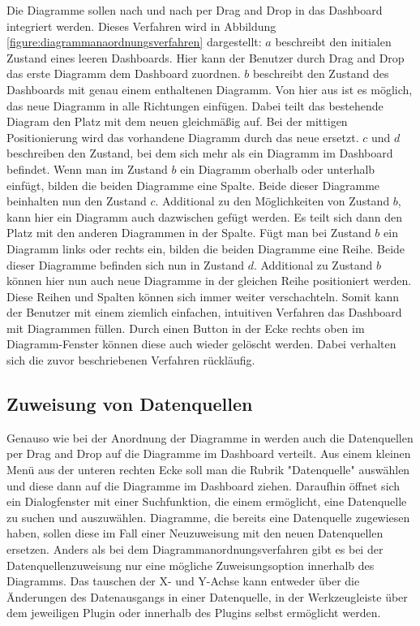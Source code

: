 Die Diagramme sollen nach und nach per Drag and Drop in das Dashboard integriert werden. Dieses Verfahren
wird in Abbildung \ref{figure:diagrammanaordnungsverfahren} dargestellt: \(a\) beschreibt den
initialen Zustand eines leeren Dashboards. Hier kann der Benutzer durch Drag and Drop das erste Diagramm dem Dashboard
zuordnen. \(b\) beschreibt den Zustand des Dashboards mit genau einem enthaltenen Diagramm. Von hier aus ist es möglich, das
neue Diagramm in alle Richtungen einfügen. Dabei teilt das bestehende Diagram den Platz mit dem neuen gleichmäßig
auf. Bei der mittigen Positionierung wird das vorhandene Diagramm durch das neue ersetzt. \(c\) und \(d\)
beschreiben den Zustand, bei dem sich mehr als ein Diagramm im Dashboard befindet. Wenn man im Zustand \(b\)
ein Diagramm oberhalb oder unterhalb einfügt, bilden die beiden Diagramme eine Spalte. Beide dieser Diagramme
beinhalten nun den Zustand \(c\). Additional zu den Möglichkeiten von Zustand \(b\), kann hier ein Diagramm
auch dazwischen gefügt werden. Es teilt sich dann den Platz mit den anderen Diagrammen in der Spalte.
Fügt man bei Zustand \(b\) ein Diagramm links oder rechts ein, bilden die beiden Diagramme eine Reihe.
Beide dieser Diagramme befinden sich nun in Zustand \(d\). Additional zu Zustand \(b\) können hier nun
auch neue Diagramme in der gleichen Reihe positioniert werden. Diese Reihen und Spalten können sich
immer weiter verschachteln. Somit kann der Benutzer mit einem ziemlich einfachen, intuitiven Verfahren
das Dashboard mit Diagrammen füllen. Durch einen Button in der Ecke rechts oben im Diagramm-Fenster
können diese auch wieder gelöscht werden. Dabei verhalten sich die zuvor beschriebenen Verfahren rückläufig.

\subsection{Zuweisung von Datenquellen}
\label{subsec:zuweisungungvondatenquellen}
Genauso wie bei der Anordnung der Diagramme in  werden
auch die Datenquellen per Drag and Drop auf die Diagramme im Dashboard verteilt. Aus einem kleinen
Menü aus der unteren rechten Ecke soll man die Rubrik "Datenquelle" auswählen und diese dann auf
die Diagramme im Dashboard ziehen. Daraufhin öffnet sich ein Dialogfenster mit einer Suchfunktion,
die einem ermöglicht, eine Datenquelle zu suchen und auszuwählen. Diagramme, die bereits eine
Datenquelle zugewiesen haben, sollen diese im Fall einer Neuzuweisung mit den neuen Datenquellen
ersetzen. Anders als bei dem Diagrammanordnungsverfahren gibt es bei der Datenquellenzuweisung
nur eine mögliche Zuweisungsoption innerhalb des Diagramms. Das tauschen der X- und Y-Achse kann
entweder über die Änderungen des Datenausgangs in einer Datenquelle, in der Werkzeugleiste über
dem jeweiligen Plugin oder innerhalb des Plugins selbst ermöglicht werden.

